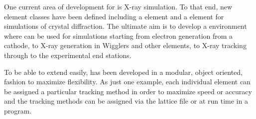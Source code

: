 One current area of development for \bmad is X-ray simulation. To that
end, new element classes have been defined including a 
element and a  element for simulations of crystal
diffraction. The ultimate aim is to develop a environment where \bmad
can be used for simulations starting from electron generation from a
cathode, to X-ray generation in Wigglers and other elements, to X-ray
tracking through to the experimental end stations.

To be able to extend \bmad easily, \bmad has been developed in a
modular, object oriented, fashion to maximize flexibility. As just one
example, each individual element can be assigned a particular tracking
method in order to maximize speed or accuracy and the tracking methods
can be assigned via the lattice file or at run time in a program.

\vfill
\break

